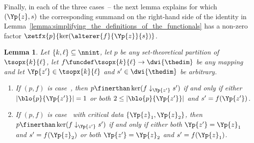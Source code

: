 \documentclass[pdftex]{sigma}
\numberwithin{equation}{section}
\newtheorem{Lemma}[Theorem]{Lemma}
\begin{document}
{
  \newcommand{\thepartition}{p}
  \newcommand{\theind}{f}
  \newcommand{\ourpoint}{\Yp{z}}
  \newcommand{\ourvalue}{s}
  Finally, in each of the three cases~\scenarioone{}--\scenariothree{} the next lemma explains for which $(\ourpoint,\ourvalue)$ the corresponding summand on the right-hand side of the identity in Lem\-ma~\ref{lemma:simplifying_the_definitions_of_the_functionals} has a non-zero factor $\zetfx{\thepartition}{\ker(\alterer{\theind}{\ourpoint}{\ourvalue})}$.
}
  {
  \newcommand{\inlen}{k}
  \newcommand{\outlen}{\ell}
  \newcommand{\theind}{f}
  \newcommand{\theindx}[1]{f(#1)}
  \newcommand{\thepoint}{\Yp{z}}
  \newcommand{\thevalue}{s}
  \newcommand{\thepartition}{p}
  \newcommand{\thealtered}{\theind\downarrow_\thepoint\thevalue}
  \newcommand{\theblock}{\blo{\thepartition}{\thepoint}}
  \newcommand{\cutblock}{\blo{\thepartition}{\thepoint}\backslash \{\thepoint\}}
  \newcommand{\sing}{\{\thepoint\}}
  \newcommand{\thelong}{\Yb{Z}}
  \newcommand{\firstspecialpoint}{\Yp{z}_1}
  \newcommand{\secondspecialpoint}{\Yp{z}_2}
  \newcommand{\specialcounter}{i}
  \newcommand{\specialpoint}[1]{\Yp{z}_{#1}}
  \newcommand{\thegood}{f}
  \newcommand{\theonevalue}{s_1}
  \newcommand{\theothervalue}{s_2}
  \newcommand{\anypoint}{\Yp{y}}
  \newcommand{\someblock}{\Yb{A}}
  \newcommand{\anyblock}{\Yb{B}}
  \newcommand{\ourpoint}{\Yp{z'}}
  \newcommand{\ourvalue}{s'}
  \newcommand{\ouraltered}{\theind\downarrow_{\ourpoint}\ourvalue}
  \begin{Lemma}
    \label{lemma:easy-cohomology-helper-non-trivial-polynomials-two-points}
    Let  $\{\inlen,\outlen\}\subseteq \nnint$, let $\thepartition$  be any set-theo\-re\-ti\-cal partition of $\tsopx{\inlen}{\outlen}$, let $\theind\funcdef\tsopx{\inlen}{\outlen}\to\dwi{\thedim}$ be any mapping and let $\ourpoint\in\tsopx{\inlen}{\outlen}$ and $\ourvalue\in\dwi{\thedim}$ be arbitrary.
    \begin{enumerate}
    \item \label{lemma:easy-cohomology-helper-non-trivial-polynomials-two-points-1}
      If $(\thepartition,\theind)$ is case~\scenarioone{},
      then $\thepartition\finerthan \ker(\ouraltered)$ if and only if either $|\blo{\thepartition}{\ourpoint}|=1$ or  both $2\leq |\blo{\thepartition}{\ourpoint}|$ and  $\ourvalue=\theindx{\ourpoint}$.
    \item \label{lemma:easy-cohomology-helper-non-trivial-polynomials-two-points-2}
      If $(\thepartition,\theind)$ is case~\scenariotwo{} with critical data $\{\firstspecialpoint,\secondspecialpoint\}$,
      then $\thepartition\finerthan \ker(\ouraltered)$ if and only if either both $\ourpoint=\firstspecialpoint$ and $\ourvalue=\theindx{\secondspecialpoint}$ or both $\ourpoint=\secondspecialpoint$ and $\ourvalue=\theindx{\firstspecialpoint}$.

\end{enumerate}
\end{Lemma}}
\end{document}
